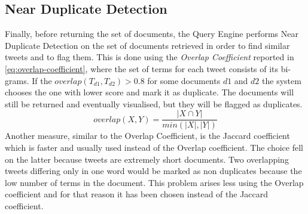 \subsection{Near Duplicate Detection}
Finally, before returning the set of documents, the Query Engine performs Near Duplicate Detection on the set of documents retrieved in order to find similar tweets and to flag them. This is done using the \textit{Overlap Coefficient} reported in \ref{eq:overlap-coefficient}, where the set of terms for each tweet consists of its bi-grams. If the $overlap(T_{d1}, T_{d2}) > 0.8$ for some documents $d1$ and $d2$ the system chooses the one with lower score and mark it as duplicate. The documents will still be returned and eventually visualised, but they will be flagged as duplicates.
\begin{equation}\label{eq:overlap-coefficient}
    overlap(X, Y) = \frac{|X \cap Y|}{min(|X|, |Y|)}
\end{equation}
Another measure, similar to the Overlap Coefficient, is the Jaccard coefficient which is faster and usually used instead of the Overlap coefficient. The choice fell on the latter because tweets are extremely short documents. Two overlapping tweets differing only in one word would be marked as non duplicates because the low number of terms in the document. This problem arises less using the Overlap coefficient and for that reason it has been chosen instead of the Jaccard coefficient.